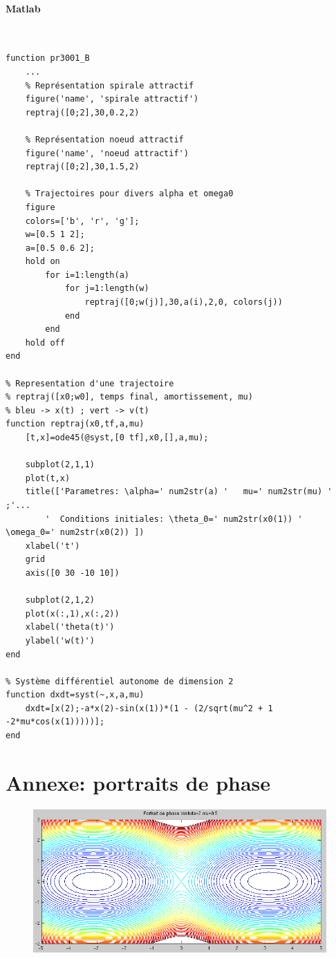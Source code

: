 \documentclass[11pt]{article}
\begin{document}
\newpage

\paragraph{Matlab}\mbox{}\\
\begin{lstlisting}
function pr3001_B
	...
    % Représentation spirale attractif
    figure('name', 'spirale attractif')
    reptraj([0;2],30,0.2,2)

    % Représentation noeud attractif
    figure('name', 'noeud attractif')
    reptraj([0;2],30,1.5,2)

    % Trajectoires pour divers alpha et omega0
    figure
    colors=['b', 'r', 'g'];
    w=[0.5 1 2];
    a=[0.5 0.6 2];
    hold on
        for i=1:length(a)
            for j=1:length(w)
                reptraj([0;w(j)],30,a(i),2,0, colors(j))
            end
        end
    hold off
end

% Representation d'une trajectoire
% reptraj([x0;w0], temps final, amortissement, mu)
% bleu -> x(t) ; vert -> v(t)
function reptraj(x0,tf,a,mu)
    [t,x]=ode45(@syst,[0 tf],x0,[],a,mu);

    subplot(2,1,1)
    plot(t,x)
    title(['Parametres: \alpha=' num2str(a) '   mu=' num2str(mu) '  ;'...
        '  Conditions initiales: \theta_0=' num2str(x0(1)) '  \omega_0=' num2str(x0(2)) ])
    xlabel('t')
    grid
    axis([0 30 -10 10])

    subplot(2,1,2)
    plot(x(:,1),x(:,2))
    xlabel('theta(t)')
    ylabel('w(t)')
end

% Système différentiel autonome de dimension 2
function dxdt=syst(~,x,a,mu)
	dxdt=[x(2);-a*x(2)-sin(x(1))*(1 - (2/sqrt(mu^2 + 1 -2*mu*cos(x(1)))))];
end
\end{lstlisting}

\newpage

\appendix
\section{Annexe: portraits de phase}
\begin{figure}[h!]
	\centering
	\includegraphics[scale=0.64]{Figures/rapport_pp05.png}
\end{figure}
\end{document}
